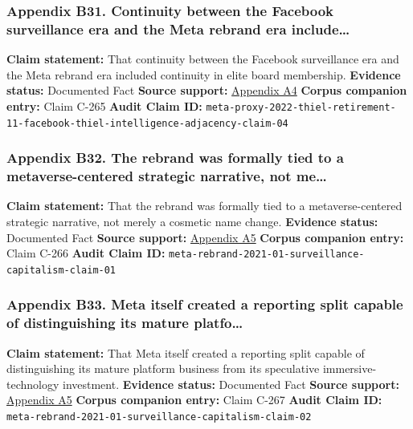 \documentclass[
  american,
  11pt,
  letterpaper,
]{article}
\begin{document}
\subsubsection{Appendix B31. Continuity between the Facebook
surveillance era and the Meta rebrand era
include\ldots{}}\label{ch-01-appendix-b31-continuity-between-the-facebook-surveillance-era-and-the-meta-rebrand-era-include}

\textbf{Claim statement:} That continuity between the Facebook
surveillance era and the Meta rebrand era included continuity in elite
board membership. \textbf{Evidence status:} Documented Fact
\textbf{Source support:}
\hyperref[ch-01-appendix-a4-meta-platforms-inc-2022-definitive-proxy-statement]{Appendix
A4} \textbf{Corpus companion entry:} Claim C-265 \textbf{Audit Claim
ID:}
\texttt{meta-proxy-2022-thiel-retirement-11-facebook-thiel-intelligence-adjacency-claim-04}

\subsubsection{Appendix B32. The rebrand was formally tied to a
metaverse-centered strategic narrative, not
me\ldots{}}\label{ch-01-appendix-b32-the-rebrand-was-formally-tied-to-a-metaverse-centered-strategic-narrative-not-me}

\textbf{Claim statement:} That the rebrand was formally tied to a
metaverse-centered strategic narrative, not merely a cosmetic name
change. \textbf{Evidence status:} Documented Fact \textbf{Source
support:}
\hyperref[ch-01-appendix-a5-the-facebook-company-is-now-meta]{Appendix
A5} \textbf{Corpus companion entry:} Claim C-266 \textbf{Audit Claim
ID:} \texttt{meta-rebrand-2021-01-surveillance-capitalism-claim-01}

\subsubsection{Appendix B33. Meta itself created a reporting split
capable of distinguishing its mature
platfo\ldots{}}\label{ch-01-appendix-b33-meta-itself-created-a-reporting-split-capable-of-distinguishing-its-mature-platfo}

\textbf{Claim statement:} That Meta itself created a reporting split
capable of distinguishing its mature platform business from its
speculative immersive-technology investment. \textbf{Evidence status:}
Documented Fact \textbf{Source support:}
\hyperref[ch-01-appendix-a5-the-facebook-company-is-now-meta]{Appendix
A5} \textbf{Corpus companion entry:} Claim C-267 \textbf{Audit Claim
ID:} \texttt{meta-rebrand-2021-01-surveillance-capitalism-claim-02}
\end{document}
